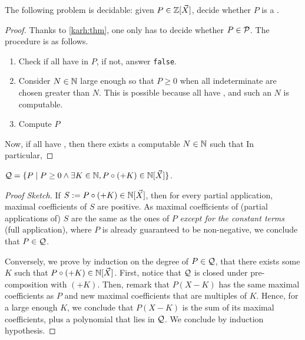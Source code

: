 \documentclass[a4paper,11pt]{article}
\begin{document}
\begin{corollary}
    The following problem is decidable: given $P \in \mathbb{Z}[\vec{X}]$,
    decide whether $P$ is a .
\end{corollary}
\begin{proof}
    Thanks to \cref{karh:thm}, one only has to decide whether
    $P \in \mathcal{P}$. The procedure is as follows.
    \begin{enumerate}
        \item Check if all  have
             in $P$, if not, answer \texttt{false}.
        \item Consider $N \in \mathbb{N}$ large enough so that
              $P \geq 0$ when all indeterminate are chosen greater
              than $N$. This is possible because all  have , and such an $N$
              is computable.
        \item Compute $P$
    \end{enumerate}

    Now, if all 
    have , then there exists a computable
    $N \in \mathbb{N}$ such that 
    In particular, 


\end{proof}


\begin{conjecture}
    $\mathcal{Q} = \mathopen{\{} P \mid  P \geq 0 \wedge \exists K \in \mathbb{N}, P \circ (+K) \in \mathbb{N}[\vec{X}] \mathclose{\}}$.
\end{conjecture}
\begin{proof}[Proof Sketch]
    If $S \mathrel{:=} P \circ (+K) \in \mathbb{N}[\vec{X}]$, then for every partial application,
    maximal coefficients of $S$ are positive. As maximal coefficients of 
    (partial applications of) $S$ are the same as the ones of $P$
    \emph{except for the constant terms} (full application),
    where $P$ is already guaranteed to be non-negative, we conclude
    that $P \in \mathcal{Q}$.

    Conversely, we prove by induction on the degree of $P \in \mathcal{Q}$,
    that there exists some $K$ such that $P \circ (+K) \in \mathbb{N}[\vec{X}]$.
    First, notice that $\mathcal{Q}$ is closed under pre-composition with
    $(+K)$. Then, remark that $P(X - K)$ has the same maximal coefficients as
    $P$ and new maximal coefficients that are multiples of $K$. Hence, for a
    large enough $K$, we conclude that $P(X - K)$ is the sum of its maximal
    coefficients, plus a polynomial that lies in $\mathcal{Q}$. We conclude by
    induction hypothesis. 
\end{proof}
\end{document}
